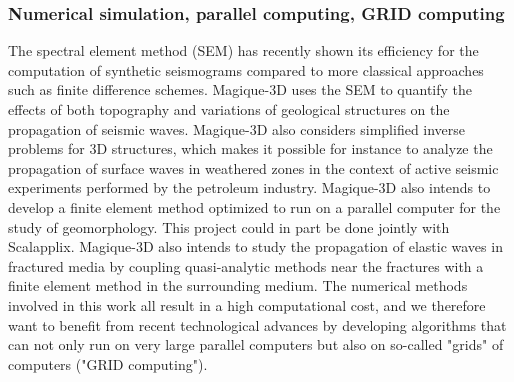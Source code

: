 \subsubsection{Numerical simulation, parallel computing, GRID computing}

    The spectral element method (SEM) has recently shown its efficiency for the computation of synthetic seismograms compared to more classical approaches such as finite difference schemes. Magique-3D uses the SEM to quantify the effects of both topography and variations of geological structures on the propagation of seismic waves. Magique-3D also considers simplified inverse problems for 3D structures, which makes it possible for instance to analyze the propagation of surface waves in weathered zones in the context of active seismic experiments performed by the petroleum industry. Magique-3D also intends to develop a finite element method optimized to run on a parallel computer for the study of geomorphology. This project could in part be done jointly with Scalapplix. Magique-3D also intends to study the propagation of elastic waves in fractured media by coupling quasi-analytic methods near the fractures with a finite element method in the surrounding medium. The numerical methods involved in this work all result in a high computational cost, and we therefore want to benefit from recent technological advances by developing algorithms that can not only run on very large parallel computers but also on so-called "grids" of computers ("GRID computing").


